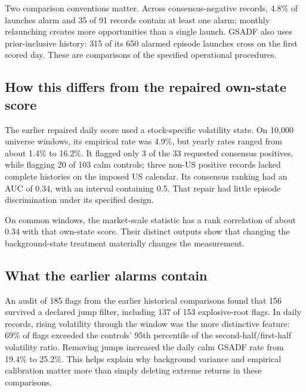 Two comparison conventions matter. Across consensus-negative records,
4.8\% of launches alarm and 35 of 91 records contain at least one alarm;
monthly relaunching creates more opportunities than a single launch.
GSADF also uses prior-inclusive history: 315 of its 650 alarmed episode
launches cross on the first scored day. These are comparisons of the
specified operational procedures.

\subsection{How this differs from the repaired own-state score}
The earlier repaired daily score used a stock-specific volatility state.
On 10,000 universe windows, its empirical rate was 4.9\%, but yearly rates
ranged from about 1.4\% to 16.2\%. It flagged only 3 of the 33 requested
consensus positives, while flagging 20 of 103 calm controls; three non-US positive
records lacked complete histories on the imposed US calendar. Its consensus ranking had an AUC of 0.34,
with an interval containing 0.5. That repair had little episode discrimination under its specified design.

On common windows, the market-scale statistic has a rank correlation of
about 0.34 with that own-state score. Their distinct outputs show that changing the background-state treatment
materially changes the measurement.

\subsection{What the earlier alarms contain}
An audit of 185 flags from the earlier historical comparisons found that
156 survived a declared jump filter, including 137 of 153 explosive-root
flags. In daily records, rising volatility through the window was the
more distinctive feature: 69\% of flags exceeded the controls' 95th
percentile of the second-half/first-half volatility ratio. Removing jumps
increased the daily calm GSADF rate from 19.4\% to 25.2\%. This helps
explain why background variance and empirical calibration matter more than
simply deleting extreme returns in these comparisons.

